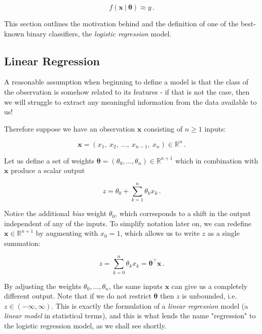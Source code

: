 \documentclass{article}[11pt]
\begin{document}
    $$
    f(\mathbf{x} \ \vert \ \boldsymbol{\theta}) \approx y \,.
    $$
    
    This section outlines the motivation behind and the definition of one of the best-known binary classifiers, the \textit{logistic regression} model.



    \subsection{Linear Regression}
        
        A reasonable assumption when beginning to define a model is that the class of the observation is somehow related to its features - if that is not the case, then we will struggle to extract any meaningful information from the data available to us!
        
        Therefore suppose we have an observation $\mathbf{x}$ consisting of $n \geq 1$ inputs:
        
        $$
        \mathbf{x} = (x_1, \ x_2, \ \ldots, \ x_{n-1}, \ x_n) \in \mathbb{R}^n \,.
        $$
        
        Let us define a set of weights $\boldsymbol{\theta} = (\theta_0, \ldots, \theta_n) \in \mathbb{R}^{n+1}$ which in combination with $\mathbf{x}$ produce a scalar output
        
        $$
        z = \theta_0 + \sum_{k=1}^n \theta_k x_k \,.
        $$
        
        Notice the additional \textit{bias} weight $\theta_0$, which corresponds to a shift in the output independent of any of the inputs. To simplify notation later on, we can redefine $\mathbf{x} \in \mathbb{R}^{n+1}$ by augmenting with $x_0 = 1$, which allows us to write $z$ as a single summation:
        
        $$
        z = \sum_{k=0}^n \theta_k x_k = \boldsymbol{\theta}^\top \mathbf{x} \,.
        $$
        
        By adjusting the weights $\theta_0, \ldots, \theta_n$, the same inputs $\mathbf{x}$ can give us a completely different output. Note that if we do not restrict $\boldsymbol{\theta}$ then $z$ is unbounded, i.e. $z \in (-\infty, \infty)$. This is exactly the formulation of a \textit{linear regression} model (a \textit{linear model} in statistical terms), and this is what lends the name "regression" to the logistic regression model, as we shall see shortly.
        
        
        
\end{document}
